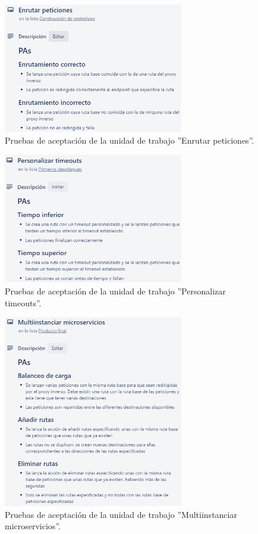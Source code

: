 \documentclass[11pt,spanish,listoffigures]{tfgetsinf}
\begin{document}
\begin{figure}[ht]
\centering
\includegraphics[width=0.7\textwidth]{imagenes/PAsEnrutarPeticiones}
\caption{Pruebas de aceptación de la unidad de trabajo ''Enrutar peticiones''.}
	\label{PAsEnrutamiento}
\end{figure}

\begin{figure}[ht]
\centering
\includegraphics[width=0.7\textwidth]{imagenes/PAsPersonalizarTimeouts}
\caption{Pruebas de aceptación de la unidad de trabajo ''Personalizar timeouts''.}
	\label{PAsPersonalizacionTimeouts}
\end{figure}

\begin{figure}[ht]
\centering
\includegraphics[width=0.7\textwidth]{imagenes/PAsMultiinstanciarMicroservicios}
\caption{Pruebas de aceptación de la unidad de trabajo ''Multiinstanciar microservicios''.}
	\label{PAsMultiinstanciaDeMicroservicios}
\end{figure}
\end{document}

